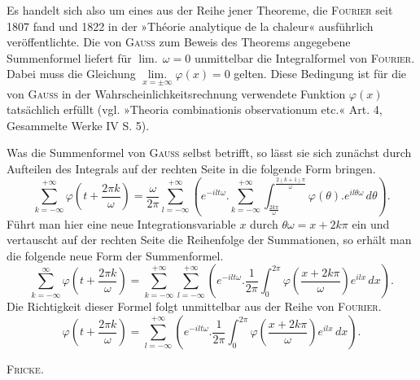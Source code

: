 %

\noindent Es handelt sich also um eines aus der Reihe jener Theoreme, die \textsc{Fourier} seit 1807 fand und 1822 in der »Théorie analytique de la chaleur« ausführlich veröffentlichte. Die von \textsc{Gauss} zum Beweis des Theorems angegebene Summenformel liefert für $\operatorname{lim.}\,\omega=0$ unmittelbar die Integralformel von \textsc{Fourier}. Dabei muss die Gleichung $\mathop{\mathrm{lim.}}\limits_{x=\pm\infty}\varphi(x)=0$ gelten. Diese Bedingung ist für die von \textsc{Gauss} in der Wahrscheinlichkeitsrechnung verwendete Funktion $\varphi(x)$ tatsächlich erfüllt (vgl. »Theoria combinationis observationum etc.« Art. 4, Gesammelte Werke IV S. 5).

Was die Summenformel von \textsc{Gauss} selbst betrifft, so lässt sie sich zunächst durch Aufteilen des Integrals auf der rechten Seite in die folgende Form bringen.
\[
\sum^{+\infty}_{k=-\infty}\varphi\!\left(t+\frac{2\pi k}{\omega}\right) = \frac{\omega}{2\pi}\sum^{+\infty}_{l=-\infty}\left(e^{-ilt\omega}\mathord{.}\sum^{+\infty}_{k=-\infty}\int^{\frac{2(k+1)\pi}{\omega}}_{\frac{2k\pi}{\omega}}\varphi(\theta)\mathord{.} e^{il\theta\omega}\,d\theta\right).
\]
\noindent Führt man hier eine neue Integrationsvariable $x$ durch $\theta\omega = x+2k\pi$ ein und vertauscht auf der rechten Seite die Reihenfolge der Summationen, so erhält man die folgende neue Form der Summenformel.
\[
\sum^{\infty}_{k=-\infty}\varphi\!\left(t+\frac{2\pi k}{\omega}\right) = \sum^{+\infty}_{k=-\infty}\sum^{+\infty}_{l=-\infty}\left(e^{-ilt\omega}\mathord{.}\frac{1}{2\pi}\int^{2\pi}_{0}\varphi\!\left(\frac{x+2k\pi}{\omega}\right)e^{ilx}\,dx\right).
\]
\noindent Die Richtigkeit dieser Formel folgt unmittelbar aus der Reihe von \textsc{Fourier}.
\[
\varphi\!\left(t+\frac{2\pi k}{\omega}\right) = \sum^{+\infty}_{l=-\infty}\left(e^{-ilt\omega}\mathord{.}\frac{1}{2\pi}\int^{2\pi}_{0}\varphi\!\left(\frac{x+2k\pi}{\omega}\right)e^{ilx}\,dx\right).
\]

\begin{flushright}
\textsc{Fricke}.
\end{flushright}
